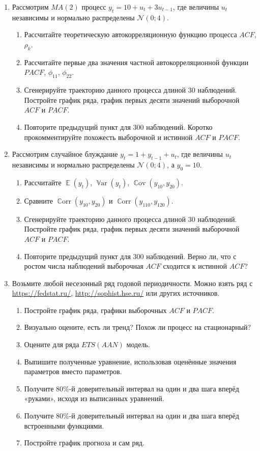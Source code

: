 \documentclass[12pt]{article}
\DeclareMathOperator{\Cov}{\mathbb{C}ov}
\DeclareMathOperator{\Corr}{\mathbb{C}orr}
\DeclareMathOperator{\Var}{\mathbb{V}ar}
\DeclareMathOperator{\E}{\mathbb{E}}
\newcommand \cN{\mathcal{N}}
\begin{document}
\begin{enumerate}

\item Рассмотрим $MA(2)$ процесс $y_t = 10 + u_t + 3 u_{t-1}$, где величины $u_t$ независимы и нормально распределены 
$\cN(0;4)$.

\begin{enumerate}
    \item Рассчитайте теоретическую автокорреляционную функцию процесса $ACF$, $\rho_k$.
    \item Рассчитайте первые два значения частной автокорреляционной функции $PACF$, $\phi_{11}$, $\phi_{22}$.
    \item Сгенерируйте траекторию данного процесса длиной 30 наблюдений. 
    Постройте график ряда, график первых десяти значений выборочной $ACF$ и $PACF$. 
    \item Повторите предыдущий пункт для 300 наблюдений. Коротко прокомментируйте похожесть выборочной и истинной $ACF$ и $PACF$.
\end{enumerate}


\item Рассмотрим случайное блуждание $y_t = 1 + y_{t-1} + u_t$, где величины $u_t$ независимы и нормально распределены 
$\cN(0;4)$, а $y_0 = 10$.

\begin{enumerate}
    \item Рассчитайте $\E(y_t)$, $\Var(y_t)$, $\Cov(y_{10}, y_{20})$.
    \item Сравните $\Corr(y_{10}, y_{20})$ и $\Corr(y_{110}, y_{120})$.
    \item Сгенерируйте траекторию данного процесса длиной 30 наблюдений. 
    Постройте график ряда, график первых десяти значений выборочной $ACF$ и $PACF$. 
    \item Повторите предыдущий пункт для 300 наблюдений. 
    Верно ли, что с ростом числа наблюдений выборочная $ACF$ сходится к истинной $ACF$?
\end{enumerate}


\item Возьмите любой несезонный ряд годовой периодичности. 
Можно взять ряд с \url{https://fedstat.ru/}, \url{http://sophist.hse.ru/} или других источников. 

\begin{enumerate}
    \item Постройте график ряда, графики выборочных $ACF$ и $PACF$.
    \item Визуально оцените, есть ли тренд? Похож ли процесс на стационарный?
    \item Оцените для ряда $ETS(AAN)$ модель. 
    \item Выпишите полученные уравнение, использовав оценённые значения параметров вместо параметров.
    \item Получите 80\%-й доверительный интервал на один и два шага вперёд «руками», исходя из выписанных уравнений. 
    \item Получите 80\%-й доверительный интервал на один и два шага вперёд встроенными функциями.
    \item Постройте график прогноза и сам ряд. 
\end{enumerate}


\end{enumerate}
\end{document}
